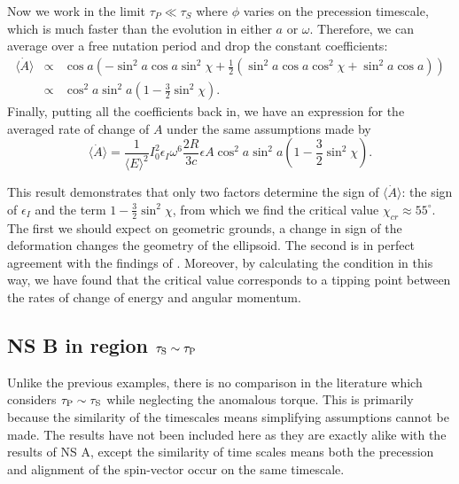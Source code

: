 \documentclass[../full_thesis/full_thesis.tex]{subfiles}
\begin{document}
Now we work in the limit $\tau_P \ll \tau_S$ where $\phi$ varies on the 
precession timescale, which is much faster than the evolution in either $a$ or $\omega$.
Therefore, we can average over a free nutation period and drop the constant
coefficients:
\begin{eqnarray*}
\langle\dot{A}\rangle &\propto& \cos a \left(-\sin^{2}a\cos a \sin^{2}\chi + 
       \frac{1}{2}\left(\sin^{2}a\cos a \cos^{2}\chi + 
       \sin^{2}a \cos a \right) \right) \\
& \propto& \cos^{2} a \sin^{2}a\left(1-\frac{3}{2}\sin^{2}\chi\right).
\end{eqnarray*}
Finally, putting all the coefficients back in, we have an expression for the averaged
rate of change of $A$ under the same assumptions made by \citet{Goldreich1970}
\begin{equation}
\langle \dot{A} \rangle =\frac{1}{\langle E\rangle ^{2}}I_{0}^{2}
                         \epsilon_{I}\omega^{6}\frac{2R}{3c}\epsilon{A} 
                         \cos^{2} a \sin^{2}a
                         \left(1-\frac{3}{2}\sin^{2}\chi\right). 
\end{equation}

This result demonstrates that only two factors determine the sign of
$\langle\dot{A}\rangle$: the sign of $\epsilon_{I}$ and the term
$1-\frac{3}{2}\sin^{2}\chi$, from which we find the critical value
$\chi_{cr}\approx55^\circ$.  The first we should expect on geometric grounds, a
change in sign of the deformation changes the geometry of the ellipsoid. The
second is in perfect agreement with the findings of \citet{Goldreich1970}.
Moreover, by calculating the condition in this way, we have found that the
critical value corresponds to a tipping point between the rates of change of
energy and angular momentum.

\FloatBarrier
\subsection{NS B in region \texorpdfstring{$\tau_{\mathrm{S}}\sim \tau_{\mathrm{P}}$}{}}
\label{sec: B_NA}
Unlike the previous examples, there is no comparison in the literature which
considers $\tau_{\mathrm{P}}\sim\tau_{\mathrm{S}}$ while neglecting the anomalous torque. This is
primarily because the similarity of the timescales means simplifying
assumptions cannot be made. The results have not been included here as they are
exactly alike with the results of NS A, except the similarity of time
scales means both the precession and alignment of the spin-vector occur on the
same timescale.
\end{document}

